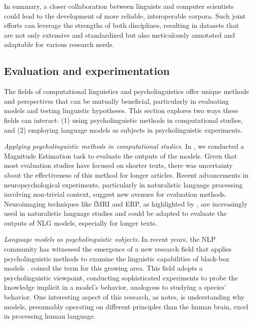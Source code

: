 In summary, a closer collaboration between linguists and computer scientists could lead to the development of more reliable, interoperable corpora. Such joint efforts can leverage the strengths of both disciplines, resulting in datasets that are not only extensive and standardized but also meticulously annotated and adaptable for various research needs.

\subsection{Evaluation and experimentation}

The fields of computational linguistics and psycholinguistics offer unique methods and perspectives that can be mutually beneficial, particularly in evaluating models and testing linguistic hypotheses. This section explores two ways these fields can interact: (1) using psycholinguistic methods in computational studies, and (2) employing language models as subjects in psycholinguistic experiments.

\textit{Applying psycholinguistic methods in computational studies.} In , we conducted a Magnitude Estimation task to evaluate the outputs of the \wsj models. Given that most evaluation studies have focused on shorter texts, there was uncertainty about the effectiveness of this method for longer articles. Recent advancements in neuropsychological experiments, particularly in naturalistic language processing involving non-trivial context, suggest new avenues for evaluation methods. Neuroimaging techniques like fMRI and ERP, as highlighted by \citet{Alday2018}, are increasingly used in naturalistic language studies and could be adapted to evaluate the outputs of NLG models, especially for longer texts.
	
\textit{Language models as psycholinguistic subjects.} In recent years, the NLP community has witnessed the emergence of a new research field that applies psycholinguistic methods to examine the linguistic capabilities of black-box models \citep{linzen2016assessing,futrell-etal-2019-neural,ettinger-2020-bert}. \citet{baroni2021proper} coined the term  for this growing area. This field adopts a psycholinguistic viewpoint, conducting sophisticated experiments to probe the knowledge implicit in a model's behavior, analogous to studying a species' behavior. One interesting aspect of this research, as \citet{baroni2021proper} notes, is understanding why models, presumably operating on different principles than the human brain, excel in processing human language.

